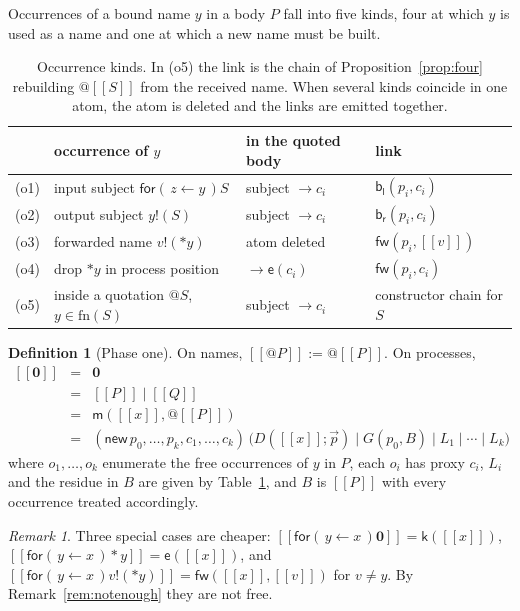 \documentclass[11pt]{article}
\makeatletter
\theoremstyle{plain}
\theoremstyle{definition}
\newtheorem{definition}[theorem]{Definition}
\theoremstyle{remark}
\newtheorem{remark}[theorem]{Remark}
\newcommand{\quo}[1]{@#1}
\newcommand{\drp}[1]{{*}#1}
\newcommand{\inp}[3]{\mathsf{for}(\,#1 \leftarrow #2\,)#3}
\newcommand{\out}[2]{#1!(#2)}
\newcommand{\nil}{\mathbf{0}}
\newcommand{\enc}[1]{[\![#1]\!]}
\newcommand{\fn}{\mathrm{fn}}
\newcommand{\mm}{\mathsf{m}}
\newcommand{\kk}{\mathsf{k}}
\newcommand{\fw}{\mathsf{fw}}
\newcommand{\bl}{\mathsf{b}_{\mathsf{l}}}
\newcommand{\br}{\mathsf{b}_{\mathsf{r}}}
\newcommand{\ev}{\mathsf{e}}
\makeatother
\begin{document}
Occurrences of a bound name $y$ in a body $P$ fall into five kinds, four at
which $y$ is used as a name and one at which a new name must be built.

\begin{table}[t]
\centering
\begin{tabular}{llll}
\toprule
 & occurrence of $y$ & in the quoted body & link\\
\midrule
(o1) & input subject $\inp{z}{y}{S}$ & subject $\to c_{i}$ & $\bl(p_{i},c_{i})$\\
(o2) & output subject $\out{y}{S}$ & subject $\to c_{i}$ & $\br(p_{i},c_{i})$\\
(o3) & forwarded name $\out{v}{\drp{y}}$ & atom deleted & $\fw(p_{i},\enc{v})$\\
(o4) & drop $\drp{y}$ in process position & $\to \ev(c_{i})$ & $\fw(p_{i},c_{i})$\\
(o5) & inside a quotation $\quo{S}$, $y \in \fn(S)$ & subject $\to c_{i}$
     & constructor chain for $S$\\
\bottomrule
\end{tabular}
\caption{Occurrence kinds. In (o5) the link is the chain of
Proposition~\ref{prop:four} rebuilding $\quo{\enc{S}}$ from the received
name. When several kinds coincide in one atom, the atom is deleted and the
links are emitted together.}
\label{tab:links}
\end{table}

\begin{definition}[Phase one]
\label{def:translation}
On names, $\enc{\quo{P}} := \quo{\enc{P}}$. On processes,
\[
\begin{array}{rcl}
  \enc{\nil} &=& \nil\\
  \enc{P \mid Q} &=& \enc{P} \mid \enc{Q}\\
  \enc{\out{x}{P}} &=& \mm(\enc{x}, \quo{\enc{P}})\\
  \enc{\inp{y}{x}{P}} &=& (\mathsf{new}\,p_{0},\dots,p_{k},c_{1},\dots,c_{k})\,
    \big(D(\enc{x};\vec p) \mid G(p_{0}, B) \mid L_{1} \mid \cdots \mid L_{k}\big)
\end{array}
\]
where $o_{1},\dots,o_{k}$ enumerate the free occurrences of $y$ in $P$, each
$o_{i}$ has proxy $c_{i}$, $L_{i}$ and the residue in $B$ are given by
Table~\ref{tab:links}, and $B$ is $\enc{P}$ with every occurrence treated
accordingly.
\end{definition}

\begin{remark}
\label{rem:opt}
Three special cases are cheaper: $\enc{\inp{y}{x}{\nil}} = \kk(\enc{x})$,
$\enc{\inp{y}{x}{\drp{y}}} = \ev(\enc{x})$, and
$\enc{\inp{y}{x}{\out{v}{\drp{y}}}} = \fw(\enc{x},\enc{v})$ for $v \neq y$.
By Remark~\ref{rem:notenough} they are not free.
\end{remark}
\end{document}
